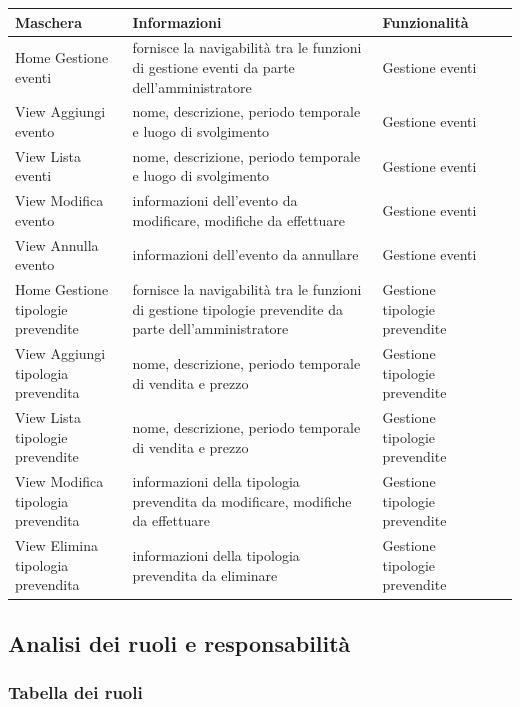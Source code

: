 \documentclass[a4paper]{article}
\begin{document}
\begin{center}
    \begin{tabularx}{1\textwidth}{|X|X|X|X|}
    \hline
    \textbf{Maschera} & \textbf{Informazioni} & \textbf{Funzionalità}\\
    \hline
    \hline
    Home Gestione eventi & fornisce la navigabilità tra le funzioni di gestione eventi da parte dell'amministratore & Gestione eventi \\
    \hline
    View Aggiungi evento & nome, descrizione, periodo temporale e luogo di svolgimento & Gestione eventi\\
    \hline
    View Lista eventi & nome, descrizione, periodo temporale e luogo di svolgimento & Gestione eventi\\
    \hline
    View Modifica evento & informazioni dell'evento da modificare, modifiche da effettuare & Gestione eventi\\
    \hline
    View Annulla evento & informazioni dell'evento da annullare & Gestione eventi\\
    \hline
    Home Gestione tipologie prevendite & fornisce la navigabilità tra le funzioni di gestione tipologie prevendite da parte dell'amministratore & Gestione tipologie prevendite \\
    \hline
    View Aggiungi tipologia prevendita & nome, descrizione, periodo temporale di vendita e prezzo & Gestione tipologie prevendite\\
    \hline
    View Lista tipologie prevendite & nome, descrizione, periodo temporale di vendita e prezzo & Gestione tipologie prevendite\\
    View Modifica tipologia prevendita & informazioni della tipologia prevendita da modificare, modifiche da effettuare & Gestione tipologie prevendite\\
    \hline
    View Elimina tipologia prevendita & informazioni della tipologia prevendita da eliminare & Gestione tipologie prevendite\\
    \hline
    \end{tabularx}
\end{center}

\newpage

\subsection{Analisi dei ruoli e responsabilità}
\subsubsection{Tabella dei ruoli}
\end{document}
